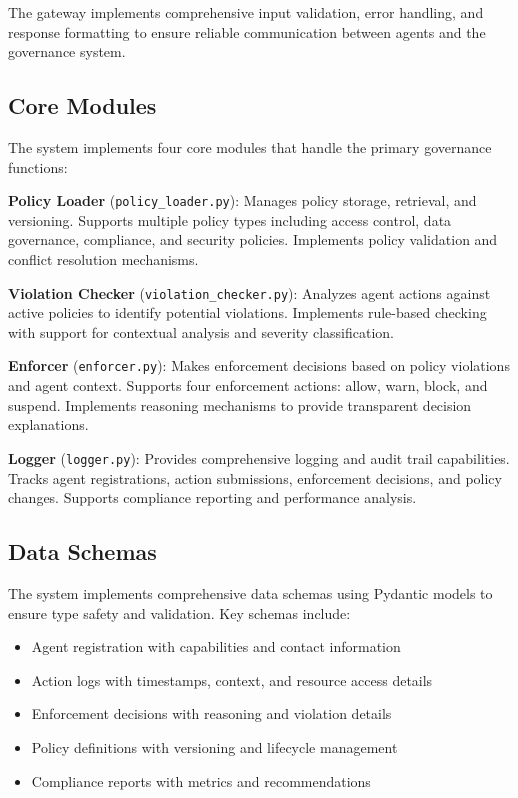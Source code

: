 \documentclass[letterpaper]{article}
\begin{document}
The gateway implements comprehensive input validation, error handling, and response formatting to ensure reliable communication between agents and the governance system.

\subsection{Core Modules}

The system implements four core modules that handle the primary governance functions:

\textbf{Policy Loader} (\texttt{policy\_loader.py}): Manages policy storage, retrieval, and versioning. Supports multiple policy types including access control, data governance, compliance, and security policies. Implements policy validation and conflict resolution mechanisms.

\textbf{Violation Checker} (\texttt{violation\_checker.py}): Analyzes agent actions against active policies to identify potential violations. Implements rule-based checking with support for contextual analysis and severity classification.

\textbf{Enforcer} (\texttt{enforcer.py}): Makes enforcement decisions based on policy violations and agent context. Supports four enforcement actions: allow, warn, block, and suspend. Implements reasoning mechanisms to provide transparent decision explanations.

\textbf{Logger} (\texttt{logger.py}): Provides comprehensive logging and audit trail capabilities. Tracks agent registrations, action submissions, enforcement decisions, and policy changes. Supports compliance reporting and performance analysis.

\subsection{Data Schemas}

The system implements comprehensive data schemas using Pydantic models to ensure type safety and validation. Key schemas include:

\begin{itemize}
\item Agent registration with capabilities and contact information
\item Action logs with timestamps, context, and resource access details
\item Enforcement decisions with reasoning and violation details
\item Policy definitions with versioning and lifecycle management
\item Compliance reports with metrics and recommendations
\end{itemize}
\end{document}
